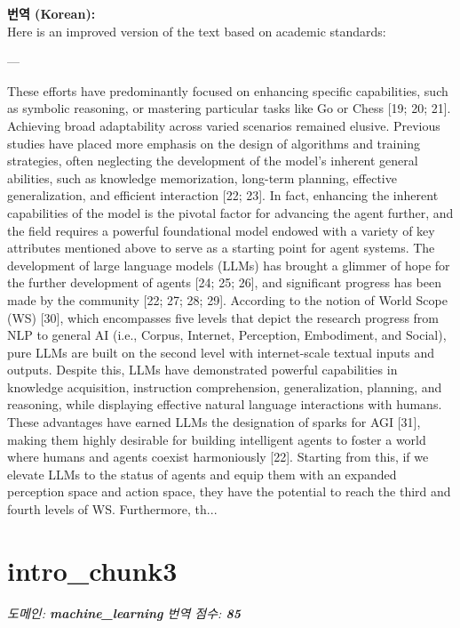 \documentclass[12pt,a4paper]{article}
\begin{document}
\begin{mdframed}[style=ko]
\noindent\textbf{\small 번역 (Korean):}\\[2pt]
Here is an improved version of the text based on academic standards:

---

These efforts have predominantly focused on enhancing specific capabilities, such as symbolic reasoning, or mastering particular tasks like Go or Chess [19; 20; 21]. Achieving broad adaptability across varied scenarios remained elusive. Previous studies have placed more emphasis on the design of algorithms and training strategies, often neglecting the development of the model’s inherent general abilities, such as knowledge memorization, long-term planning, effective generalization, and efficient interaction [22; 23]. In fact, enhancing the inherent capabilities of the model is the pivotal factor for advancing the agent further, and the field requires a powerful foundational model endowed with a variety of key attributes mentioned above to serve as a starting point for agent systems. The development of large language models (LLMs) has brought a glimmer of hope for the further development of agents [24; 25; 26], and significant progress has been made by the community [22; 27; 28; 29]. According to the notion of World Scope (WS) [30], which encompasses five levels that depict the research progress from NLP to general AI (i.e., Corpus, Internet, Perception, Embodiment, and Social), pure LLMs are built on the second level with internet-scale textual inputs and outputs. Despite this, LLMs have demonstrated powerful capabilities in knowledge acquisition, instruction comprehension, generalization, planning, and reasoning, while displaying effective natural language interactions with humans. These advantages have earned LLMs the designation of sparks for AGI [31], making them highly desirable for building intelligent agents to foster a world where humans and agents coexist harmoniously [22]. Starting from this, if we elevate LLMs to the status of agents and equip them with an expanded perception space and action space, they have the potential to reach the third and fourth levels of WS. Furthermore, th...
\end{mdframed}
\vspace{1em}

\section{intro\_chunk3}
\noindent\textit{\small 도메인: \textbf{machine\_learning} \quad 번역 점수: \textbf{\color{green!60!black}85}}
\vspace{0.5em}
\end{document}
